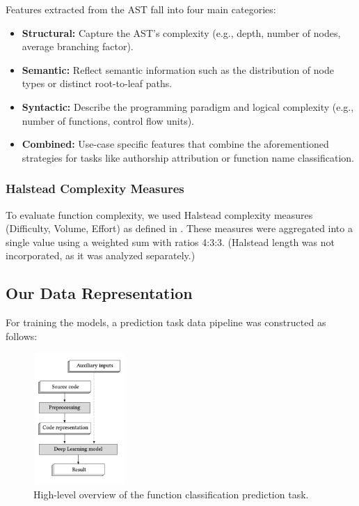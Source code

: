 \documentclass[conference]{IEEEtran}
\begin{document}
Features extracted from the AST fall into four main categories:
\begin{itemize}
    \item \textbf{Structural:} Capture the AST's complexity (e.g., depth, number of nodes, average branching factor).
    \item \textbf{Semantic:} Reflect semantic information such as the distribution of node types or distinct root-to-leaf paths.
    \item \textbf{Syntactic:} Describe the programming paradigm and logical complexity (e.g., number of functions, control flow units).
    \item \textbf{Combined:} Use-case specific features that combine the aforementioned strategies for tasks like authorship attribution or 
    function name classification.
\end{itemize}

\subsubsection{Halstead Complexity Measures}

To evaluate function complexity, we used Halstead complexity measures (Difficulty, Volume, Effort) as defined in \cite{halstead}. 
These measures were aggregated into a single value using a weighted sum with ratios 4:3:3. (Halstead length was not incorporated, as it was analyzed separately.)

\subsection{Our Data Representation}

For training the models, a prediction task data pipeline was constructed as follows:

\begin{figure}[!t]
    \centering
    \includegraphics[width=3.5cm,height=5cm]{figures/high_level_prediciton_task.png}
    \caption{\cite{compiler_based} High-level overview of the function classification prediction task.}
    \label{fig:predictive_task}
\end{figure}
\end{document}
